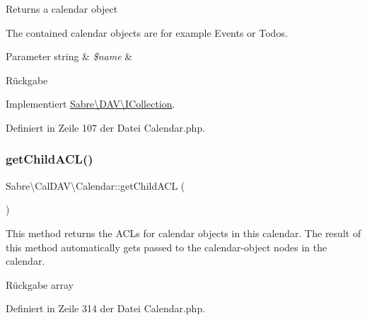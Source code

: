 Returns a calendar object

The contained calendar objects are for example Events or Todo\textquotesingle{}s.


\begin{DoxyParams}[1]{Parameter}
string & {\em \$name} & \\
\hline
\end{DoxyParams}
\begin{DoxyReturn}{Rückgabe}

\end{DoxyReturn}


Implementiert \mbox{\hyperlink{interface_sabre_1_1_d_a_v_1_1_i_collection_a09f82b07550611752abb149f468b89c2}{Sabre\textbackslash{}\+D\+A\+V\textbackslash{}\+I\+Collection}}.



Definiert in Zeile 107 der Datei Calendar.\+php.

\mbox{\label{class_sabre_1_1_cal_d_a_v_1_1_calendar_a2452b92f425e3b2c204734af593a4c1d}} 
\subsubsection{\texorpdfstring{get\+Child\+A\+C\+L()}{getChildACL()}}
{\footnotesize\ttfamily Sabre\textbackslash{}\+Cal\+D\+A\+V\textbackslash{}\+Calendar\+::get\+Child\+A\+CL (\begin{DoxyParamCaption}{ }\end{DoxyParamCaption})}

This method returns the A\+CL\textquotesingle{}s for calendar objects in this calendar. The result of this method automatically gets passed to the calendar-\/object nodes in the calendar.

\begin{DoxyReturn}{Rückgabe}
array 
\end{DoxyReturn}


Definiert in Zeile 314 der Datei Calendar.\+php.

\mbox{\label{class_sabre_1_1_cal_d_a_v_1_1_calendar_a438e79532992b4da02ed17df296a9346}} 
